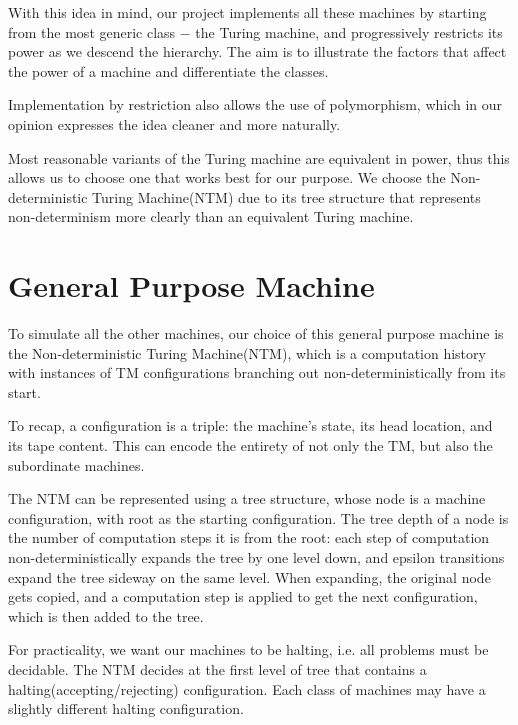 \documentclass[12pt]{article}  %
\begin{document}
With this idea in mind, our project implements all these machines by starting from the most generic class $-$ the Turing machine, and progressively restricts its power as we descend the hierarchy. The aim is to illustrate the factors that affect the power of a machine and differentiate the classes. 

Implementation by restriction also allows the use of polymorphism, which in our opinion expresses the idea cleaner and more naturally.

Most reasonable variants of the Turing machine are equivalent in power, thus this allows us to choose one that works best for our purpose. We choose the Non-deterministic Turing Machine(NTM) due to its tree structure that represents non-determinism more clearly than an equivalent Turing machine.







\section{General Purpose Machine} \label{NTM}

To simulate all the other machines, our choice of this general purpose machine is the Non-deterministic Turing Machine(NTM), which is a computation history with instances of TM configurations branching out non-deterministically from its start. 

To recap, a configuration is a triple: the machine's state, its head location, and its tape content. This can encode the entirety of not only the TM, but also the subordinate machines.

The NTM can be represented using a tree structure, whose node is a machine configuration, with root as the starting configuration. The tree depth of a node is the number of computation steps it is from the root: each step of computation non-deterministically expands the tree by one level down, and epsilon transitions expand the tree sideway on the same level. When expanding, the original node gets copied, and a computation step is applied to get the next configuration, which is then added to the tree.

For practicality, we want our machines to be halting, i.e. all problems must be decidable. The NTM decides at the first level of tree that contains a halting(accepting/rejecting) configuration. Each class of machines may have a slightly different halting configuration.
\end{document}
